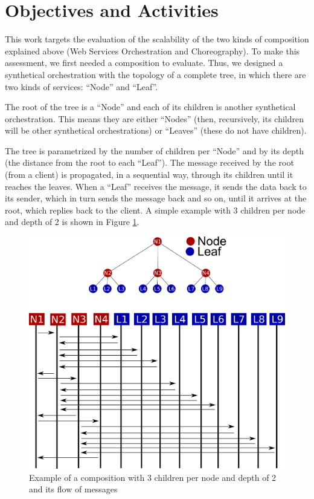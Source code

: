 \section{Objectives and Activities}

This work targets the evaluation of the scalability of the two kinds of composition explained above (Web Services Orchestration and Choreography). To make this assessment, we first needed a composition to evaluate. Thus, we designed a synthetical orchestration with the topology of a complete tree, in which there are two kinds of services: ``Node'' and ``Leaf''.

The root of the tree is a ``Node'' and each of its children is another synthetical orchestration. This means they are either ``Nodes'' (then, recursively, its children will be other synthetical orchestrations) or ``Leaves'' (these do not have children).

The tree is parametrized by the number of children per ``Node'' and by its depth (the distance from the root to each ``Leaf''). The message received by the root (from a client) is propagated, in a sequential way, through its children until it reaches the leaves. When a ``Leaf'' receives the message, it sends the data back to its sender, which in turn sends the message back and so on, until it arrives at the root, which replies back to the client. A simple example with 3 children per node and depth of 2 is shown in Figure \ref{synthetical-example}.

\begin{figure}[htb]
	\centering
	\includegraphics[width=\textwidth]{images/synthetical-example}
	\caption{Example of a composition with 3 children per node and depth of 2 and its flow of messages}
	\label{synthetical-example}
\end{figure}

